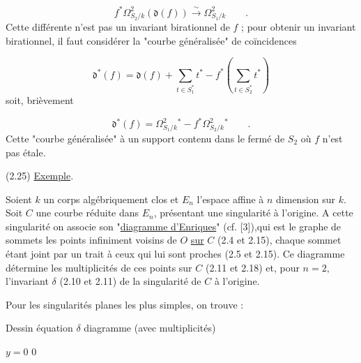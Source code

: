 \begin{equation*}
f^* \Omega^2_{S_2/k} (\mathfrak{d}(f)) \overset{\sim}{\longrightarrow} \Omega^2_{S_1/k} \qquad .
\end{equation*}
Cette différente n'est pas un invariant birationnel de $f$ ; pour obtenir un invariant birationnel, il faut considérer la "courbe généralisée" de coïncidences

\begin{equation*}
\mathfrak{d}^*(f) = \mathfrak{d}(f) + \sum_{t \in S_1^*} t^* - f^* ( \sum_{t \in S_2^*} t^*)
\end{equation*}
soit, brièvement

\begin{equation*}
\mathfrak{d}^*(f) = \Omega^2_{S_1/k}{}^* - f^* \Omega^2_{S_2/k}{}^* \qquad .
\end{equation*}
Cette "courbe généralisée" à un support contenu dans le fermé de $S_2$ où $f$ n'est pas étale.



(2.25) \underline{Exemple}.

Soient $k$ un corps algébriquement clos et $E_n$ l'espace affine à $n$ dimension sur $k$. Soit $C$ une courbe réduite dans $E_n$, présentant une singularité à l'origine. A cette singularité on associe son "\underline{diagramme d'Enriques}" (cf. [3]),qui est le graphe de sommets les points infiniment voisins de $O$ \underline{sur} $C$ (2.4 et 2.15), chaque sommet étant joint par un trait à ceux qui lui sont proches (2.5 et 2.15). Ce diagramme détermine les multiplicités de ces points sur $C$ (2.11 et 2.18) et, pour $n = 2$, l'invariant $\delta$ (2.10 et 2.11) de la singularité de $C$ à l'origine.

Pour les singularités planes les plus simples, on trouve :

\noindent Dessin \hspace{5em} équation \hspace{5em} $\delta$ \hspace{5em} diagramme (avec multiplicités)

 \hspace{4em} $y = 0$ \hspace{4em} $0$

